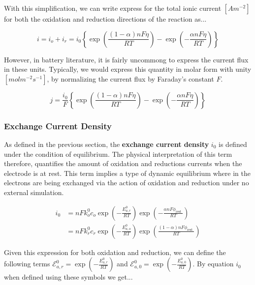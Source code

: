 \documentclass[lettersize,journal]{IEEEtran}
\begin{document}
\noindent With this simplification, we can write express for the total ionic current $\left[ Am^{-2} \right]$ for both the oxidation and reduction directions of the reaction as...

\begin{equation}
i=i_{o}+i_{r}=i_{0}\left\{\exp \left(\frac{(1-\alpha) n F \eta}{R T}\right)-\exp \left(-\frac{\alpha n F \eta}{R T}\right)\right\}
\end{equation}

\noindent However, in battery literature, it is fairly uncommong to express the current flux in these units. Typically, we would express this quantity in molar form with unity $\left[ mol m^{-2} s^{-1} \right]$, by normalizing the current flux by Faraday's constant $F$.


\begin{equation}
j=\frac{i_{0}}{F}\left\{\exp \left(\frac{(1-\alpha) n F \eta}{R T}\right)-\exp \left(-\frac{\alpha n F \eta}{R T}\right)\right\}
\end{equation}


\subsubsection{Exchange Current Density}
As defined in the previous section, the \textbf{exchange current density}  $i_0$ is defined under the condition of equilibrium. The physical interpretation of this term therefore, quantifies the amount of oxidation and reductions currents when the electrode is at rest. This term implies a type of dynamic equilibrium where in the electrons are being exchanged via the action of oxidation and reduction under no external simulation.

\begin{equation}
\begin{aligned}
i_{0} &=n F k_{o}^{0} c_{o} \exp \left(-\frac{E_{a, r}^{0}}{R T}\right) \exp \left(-\frac{\alpha n F \phi_{\text {rest }}}{R T}\right) \\
&=n F k_{r}^{0} c_{r} \exp \left(-\frac{E_{a, o}^{0}}{R T}\right) \exp \left(\frac{(1-\alpha) n F \phi_{\text {rest }}}{R T}\right)
\end{aligned}
\end{equation}


\noindent Given this expression for both oxidation and reduction, we can define the following terms $\mathscr{E}_{a, r}^{0}=\exp \left(-\frac{E_{a, r}^{0}}{R T}\right)$ and $ \mathscr{E}_{a, 0}^{0}=\exp \left(-\frac{E_{a, 0}^{0}}{R T}\right)$. By equation $i_0$ when defined using these symbols we get...
\end{document}
